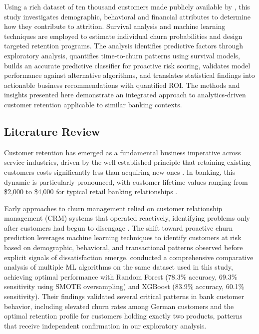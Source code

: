 \documentclass[12pt]{article}
\begin{document}
Using a rich dataset of ten thousand customers made publicly available by \citet{kollipara2022bank}, this study investigates demographic, behavioral and financial attributes to determine how they contribute to attrition.  Survival analysis and machine learning techniques are employed to estimate individual churn probabilities and design targeted retention programs.  The analysis identifies predictive factors through exploratory analysis, quantifies time‑to‑churn patterns using survival models, builds an accurate predictive classifier for proactive risk scoring, validates model performance against alternative algorithms, and translates statistical findings into actionable business recommendations with quantified ROI.  The methods and insights presented here demonstrate an integrated approach to analytics‑driven customer retention applicable to similar banking contexts.

\subsection{Literature Review}
Customer retention has emerged as a fundamental business imperative across service industries, driven by the well-established principle that retaining existing customers costs significantly less than acquiring new ones \citep{businessbuilders2024cost}. In banking, this dynamic is particularly pronounced, with customer lifetime values ranging from \$2,000 to \$4,000 for typical retail banking relationships \citep{meleis2010clv}.

Early approaches to churn management relied on customer relationship management (CRM) systems that operated reactively, identifying problems only after customers had begun to disengage \citep{singh2024productchurn}. The shift toward proactive churn prediction leverages machine learning techniques to identify customers at risk based on demographic, behavioral, and transactional patterns observed before explicit signals of dissatisfaction emerge. \citet{singh2024productchurn} conducted a comprehensive comparative analysis of multiple ML algorithms on the same dataset used in this study, achieving optimal performance with Random Forest (78.3\% accuracy, 69.3\% sensitivity using SMOTE oversampling) and XGBoost (83.9\% accuracy, 60.1\% sensitivity). Their findings validated several critical patterns in bank customer behavior, including elevated churn rates among German customers and the optimal retention profile for customers holding exactly two products, patterns that receive independent confirmation in our exploratory analysis.
\end{document}
